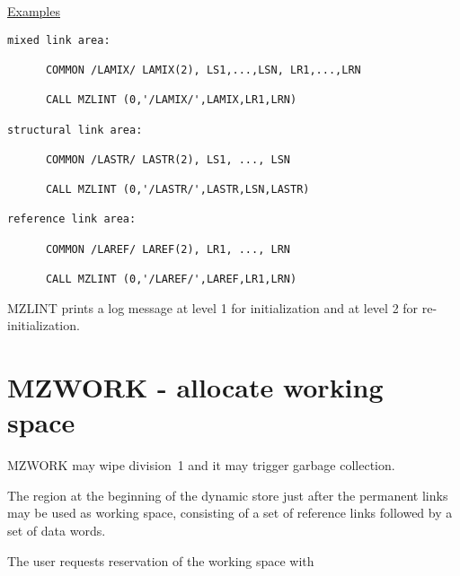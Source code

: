 \ul{Examples}
\begin{verbatim}
mixed link area:

      COMMON /LAMIX/ LAMIX(2), LS1,...,LSN, LR1,...,LRN

      CALL MZLINT (0,'/LAMIX/',LAMIX,LR1,LRN)

structural link area:

      COMMON /LASTR/ LASTR(2), LS1, ..., LSN

      CALL MZLINT (0,'/LASTR/',LASTR,LSN,LASTR)

reference link area:

      COMMON /LAREF/ LAREF(2), LR1, ..., LRN

      CALL MZLINT (0,'/LAREF/',LAREF,LR1,LRN)
\end{verbatim} 
MZLINT prints a log message at level 1 for initialization
and at level 2 for re-initialization.

\section{MZWORK - allocate working space}

MZWORK may wipe division~1 and it may trigger garbage collection.

The region at the beginning of the dynamic store just after
the permanent links may be used as working space,
consisting of a set of reference links followed by
a set of data words.

The user requests reservation of the working space with

